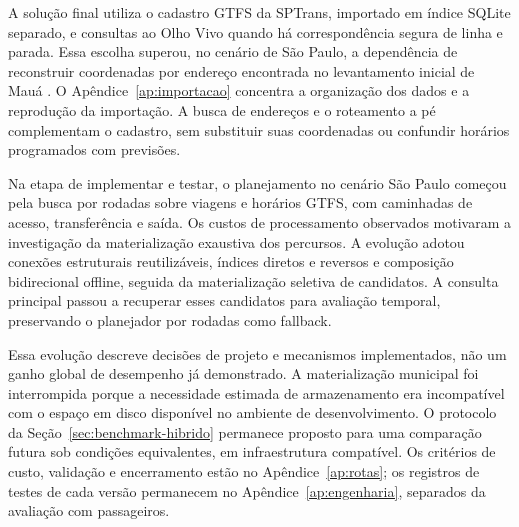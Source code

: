 \documentclass[12pt,oneside,a4paper,brazil,chapter=TITLE]{abntex2}
\begin{document}
\endgroup

\label{sec:conversao}
A solução final utiliza o cadastro GTFS da SPTrans, importado em índice SQLite separado, e consultas ao Olho Vivo quando há correspondência segura de linha e parada. Essa escolha superou, no cenário de São Paulo, a dependência de reconstruir coordenadas por endereço encontrada no levantamento inicial de Mauá \citep{mbmimportacoes}. O Apêndice~\ref{ap:importacao} concentra a organização dos dados e a reprodução da importação. A busca de endereços e o roteamento a pé complementam o cadastro, sem substituir suas coordenadas ou confundir horários programados com previsões.

\label{sec:implementar-testar}
Na etapa de implementar e testar, o planejamento no cenário São Paulo começou pela busca por rodadas sobre viagens e horários GTFS, com caminhadas de acesso, transferência e saída. Os custos de processamento observados motivaram a investigação da materialização exaustiva dos percursos. A evolução adotou conexões estruturais reutilizáveis, índices diretos e reversos e composição bidirecional offline, seguida da materialização seletiva de candidatos. A consulta principal passou a recuperar esses candidatos para avaliação temporal, preservando o planejador por rodadas como fallback.

\begin{samepage}
Essa evolução descreve decisões de projeto e mecanismos implementados, não um ganho global de desempenho já demonstrado. A materialização municipal foi interrompida porque a necessidade estimada de armazenamento era incompatível com o espaço em disco disponível no ambiente de desenvolvimento. O protocolo da Seção~\ref{sec:benchmark-hibrido} permanece proposto para uma comparação futura sob condições equivalentes, em infraestrutura compatível. Os critérios de custo, validação e encerramento estão no Apêndice~\ref{ap:rotas}; os registros de testes de cada versão permanecem no Apêndice~\ref{ap:engenharia}, separados da avaliação com passageiros.
\par\end{samepage}
\end{document}
